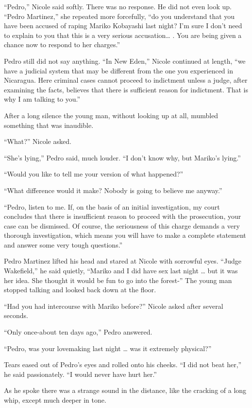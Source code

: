 \documentclass[]{article}
\begin{document}
{“Pedro,” Nicole said softly. There was no response. He did not even look up. “Pedro Martinez,” she repeated more forcefully, “do you understand that you have been accused of raping Mariko Kobayashi last night? I’m sure I don’t need to explain to you that this is a very serious accusation… . You are being given a chance now to respond to her charges.”

Pedro still did not say anything. “In New Eden,” Nicole continued at length, “we have a judicial system that may be different from the one you experienced in Nicaragua. Here criminal cases cannot proceed to indictment unless a judge, after examining the facts, believes that there is sufficient reason for indictment. That is why I am talking to you.”

After a long silence the young man, without looking up at all, mumbled something that was inaudible.

“What?” Nicole asked.

“She’s lying,” Pedro said, much louder. “I don’t know why, but Mariko’s lying.”

“Would you like to tell me your version of what happened?”

“What difference would it make? Nobody is going to believe me anyway.”

“Pedro, listen to me. If, on the basis of an initial investigation, my court concludes that there is insufficient reason to proceed with the prosecution, your case can be dismissed. Of course, the seriousness of this charge demands a very thorough investigation, which means you will have to make a complete statement and answer some very tough questions.”

Pedro Martinez lifted his head and stared at Nicole with sorrowful eyes. “Judge Wakefield,” he said quietly, “Mariko and I did have sex last night … but it was her idea. She thought it would be fun to go into the forest-” The young man stopped talking and looked back down at the floor.

“Had you had intercourse with Mariko before?” Nicole asked after several seconds.

“Only once-about ten days ago,” Pedro answered.

“Pedro, was your lovemaking last night … was it extremely physical?”

Tears eased out of Pedro’s eyes and rolled onto his cheeks. “I did not beat her,” he said passionately. “I would never have hurt her.”

As he spoke there was a strange sound in the distance, like the cracking of a long whip, except much deeper in tone.

}
\end{document}
